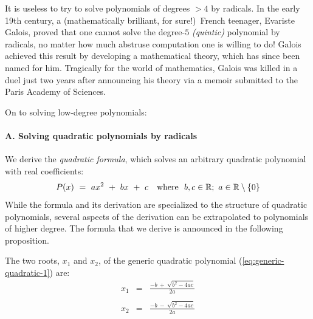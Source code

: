 It is useless to try to solve polynomials of degrees $> 4$ by
radicals.  In the early 19th century, a (mathematically brilliant, for
sure!)~French teenager, Evariste Galois,
proved that one cannot solve the degree-$5$ {\it (quintic)}
 polynomial by radicals, no matter how much
abstruse computation one is willing to do!  Galois achieved this
result by developing a mathematical theory, which has since been named
for him.  Tragically for the world of
mathematics, Galois was killed in a duel just two years after
announcing his theory via a memoir submitted to the Paris Academy of
Sciences.
\bigskip

\noindent
On to solving low-degree polynomials:
\medskip

\paragraph{A. Solving quadratic polynomials by radicals}

\noindent
We derive the {\it quadratic formula}, which solves an arbitrary
quadratic polynomial  with real
coefficients:  
\begin{equation}
\label{eq:generic-quadratic-1}
P(x) \ = \  ax^2 \ + \ bx \ + \ c \ \ \mbox{  where  } \ b,c \in \mathbb{R};
\ a \in \mathbb{R} \setminus \{0\}
\end{equation}
While the formula and its derivation are specialized to the structure
of quadratic polynomials, several aspects of the derivation can be
extrapolated to polynomials of higher degree.  The formula that we
derive is announced in the following proposition.  

\begin{prop}
\label{thm:quadratic-formula}
The two roots, $x_1$ and $x_2$, of the generic quadratic polynomial
(\ref{eq:generic-quadratic-1}) are:
\begin{eqnarray}
\nonumber
x_1 & = & \frac{-b \ + \ \sqrt{b^2 -4ac}}{2a} \\
\label{eq:generic-quadratic-4}
    &   & \\
\nonumber
x_2 & = & \frac{-b \ - \ \sqrt{b^2 -4ac}}{2a}
\end{eqnarray}
\end{prop}


